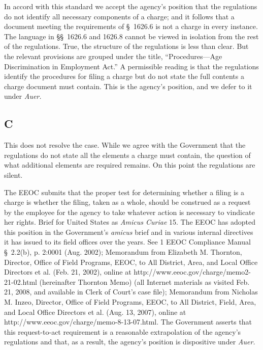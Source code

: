   In accord with this standard we accept the agency's position that
the regulations do not identify all necessary components of a charge;
and it follows that a document meeting the requirements of \S~1626.6
is not a charge in every instance. The language in \S\S~1626.6 and
1626.8 cannot be viewed in isolation from the rest of the regulations.
True, the structure of the regulations is less than clear. But the
relevant provisions are grouped under the title, ``Procedures---Age
Discrimination in Employment Act.'' A permissible reading is that the
regulations identify the procedures for filing a charge but do not state
the full contents a charge document must contain. This is the agency's
position, and we defer to it under \emph{Auer.} \newpage 


\subsection{C}

  This does not resolve the case. While we agree with the Government
that the regulations do not state all the elements a charge must
contain, the question of what additional elements are required remains.
On this point the regulations are silent.

  The EEOC submits that the proper test for determining whether a
filing is a charge is whether the filing, taken as a whole, should be
construed as a request by the employee for the agency to take whatever
action is necessary to vindicate her rights. Brief for United States
as \emph{Amicus Curiae} 15. The EEOC has adopted this position in the
Government's \emph{amicus} brief and in various internal directives it
has issued to its field offices over the years. See 1 EEOC Compliance
Manual \S~2.2(b), p. 2:0001 (Aug. 2002); Memorandum from Elizabeth M.
Thornton, Director, Office of Field Programs, EEOC, to All District,
Area, and Local Office Directors et al. (Feb. 21, 2002), online at
http://www.eeoc.gov/charge/memo2-21-02.html (hereinafter Thornton
Memo) (all Internet materials as visited Feb. 21, 2008, and available
in Clerk of Court's case file); Memorandum from Nicholas M. Inzeo,
Director, Office of Field Programs, EEOC, to All District, Field,
Area, and Local Office Directors et al. (Aug. 13, 2007), online at
http://www.eeoc.gov/charge/memo-8-13-07.html. The Government asserts
that this request-to-act requirement is a reasonable extrapolation
of the agency's regulations and that, as a result, the agency's
position is dispositive under \emph{Auer.}

